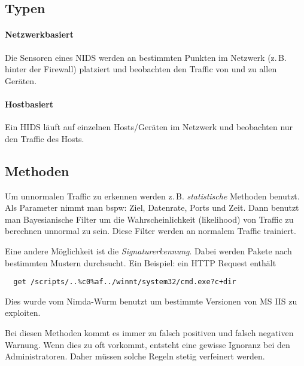 \subsection{Typen}%
\label{sub:typen}

\paragraph{Netzwerkbasiert}%
\label{par:netzwerkbasiert}

Die Sensoren eines NIDS werden an bestimmten Punkten im Netzwerk (z.\,B. hinter der
Firewall) platziert und beobachten den Traffic von und zu allen Geräten.

\paragraph{Hostbasiert}%
\label{par:hostbasiert}

Ein HIDS läuft auf einzelnen Hosts/Geräten im Netzwerk und beobachten nur den Traffic des
Hosts.

\subsection{Methoden}%
\label{sub:methoden}

Um unnormalen Traffic zu erkennen werden z.\,B. \emph{statistische} Methoden benutzt.
Als Parameter nimmt man bspw: Ziel, Datenrate, Ports und Zeit.
Dann benutzt man Bayesianische Filter um die Wahrscheinlichkeit (likelihood) von Traffic
zu berechnen unnormal zu sein.
Diese Filter werden an normalem Traffic trainiert.

Eine andere Möglichkeit ist die \emph{Signaturerkennung}.
Dabei werden Pakete nach bestimmten Mustern durchsucht.
Ein Beispiel: ein HTTP Request enthält
\begin{verbatim}
  get /scripts/..%c0%af../winnt/system32/cmd.exe?c+dir
\end{verbatim}
Dies wurde vom Nimda-Wurm benutzt um bestimmte Versionen von MS IIS zu exploiten.

Bei diesen Methoden kommt es immer zu falsch positiven und falsch negativen Warnung.
Wenn dies zu oft vorkommt, entsteht eine gewisse Ignoranz bei den Administratoren.
Daher müssen solche Regeln stetig verfeinert werden.
